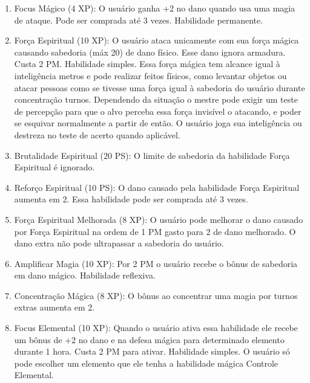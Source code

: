  
\begin{enumerate}

	\item Focus Mágico (4 XP): O usuário ganha +2 no dano quando usa uma magia de ataque. Pode ser comprada até 3 vezes. Habilidade permanente.

 	\item Força Espiritual (10 XP): O usuário ataca unicamente com sua força mágica causando sabedoria (máx 20) de dano físico. Esse dano ignora armadura. Custa 2 PM. Habilidade simples. Essa força mágica tem alcance igual à inteligência metros e pode realizar feitos físicos, como levantar objetos ou atacar pessoas como se tivesse uma força igual à sabedoria do usuário durante concentração turnos. Dependendo da situação o mestre pode exigir um teste de percepção para que o alvo perceba essa força invisível o atacando, e poder se esquivar normalmente a partir de então. O usuário joga sua inteligência ou destreza no teste de acerto quando aplicável.

 	\item Brutalidade Espiritual (20 PS): O limite de sabedoria da habilidade Força Espiritual é ignorado.
 	
	 	
 	\item Reforço Espiritual (10 PS): O dano causado pela habilidade Força Espiritual aumenta em 2. Essa habilidade pode ser comprada até 3 vezes.
 	
 	\item Força Espiritual Melhorada (8 XP): O usuário pode melhorar o dano causado por Força Espiritual na ordem de 1 PM gasto para 2 de dano melhorado. O dano extra não pode ultrapassar a sabedoria do usuário.
 
 	\item Amplificar Magia (10 XP): Por 2 PM o usuário recebe o bônus de sabedoria em dano mágico. Habilidade reflexiva.
 	
 	\item Concentração Mágica (8 XP): O bônus ao concentrar uma magia por turnos extras aumenta em 2.
 	
 	\item Focus Elemental (10 XP): Quando o usuário ativa essa habilidade ele recebe um bônus de +2 no dano e na defesa mágica para determinado elemento durante 1 hora. Custa 2 PM para ativar. Habilidade simples. O usuário só pode escolher um elemento que ele tenha a habilidade mágica Controle Elemental.
 	

\end{enumerate}
